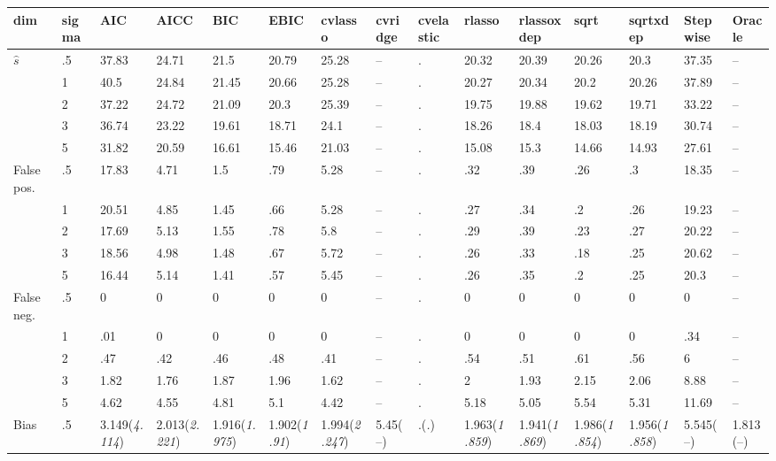 \documentclass{article}
\begin{document}
\begin{table}[tbp] \centering
{}

{\tiny
\begin{tabularx}{\textwidth}{lCCCCCCCCCCCCCC}

\toprule
{dim}&{sigma}&{AIC}&{AICC}&{BIC}&{EBIC}&{cvlasso}&{cvridge}&{cvelastic}&{rlasso}&{rlassoxdep}&{sqrt}&{sqrtxdep}&{Stepwise}&{Oracle} \tabularnewline
\midrule\addlinespace[1.5ex]
$\hat{s}$&.5&37.83&24.71&21.5&20.79&25.28&--&.&20.32&20.39&20.26&20.3&37.35&-- \tabularnewline
&1&40.5&24.84&21.45&20.66&25.28&--&.&20.27&20.34&20.2&20.26&37.89&-- \tabularnewline
&2&37.22&24.72&21.09&20.3&25.39&--&.&19.75&19.88&19.62&19.71&33.22&-- \tabularnewline
&3&36.74&23.22&19.61&18.71&24.1&--&.&18.26&18.4&18.03&18.19&30.74&-- \tabularnewline
&5&31.82&20.59&16.61&15.46&21.03&--&.&15.08&15.3&14.66&14.93&27.61&-- \tabularnewline
\midrule False pos.&.5&17.83&4.71&1.5&.79&5.28&--&.&.32&.39&.26&.3&18.35&-- \tabularnewline
&1&20.51&4.85&1.45&.66&5.28&--&.&.27&.34&.2&.26&19.23&-- \tabularnewline
&2&17.69&5.13&1.55&.78&5.8&--&.&.29&.39&.23&.27&20.22&-- \tabularnewline
&3&18.56&4.98&1.48&.67&5.72&--&.&.26&.33&.18&.25&20.62&-- \tabularnewline
&5&16.44&5.14&1.41&.57&5.45&--&.&.26&.35&.2&.25&20.3&-- \tabularnewline
\midrule False neg.&.5&0&0&0&0&0&--&.&0&0&0&0&0&-- \tabularnewline
&1&.01&0&0&0&0&--&.&0&0&0&0&.34&-- \tabularnewline
&2&.47&.42&.46&.48&.41&--&.&.54&.51&.61&.56&6&-- \tabularnewline
&3&1.82&1.76&1.87&1.96&1.62&--&.&2&1.93&2.15&2.06&8.88&-- \tabularnewline
&5&4.62&4.55&4.81&5.1&4.42&--&.&5.18&5.05&5.54&5.31&11.69&-- \tabularnewline
\midrule Bias&.5&3.149\newline (\emph{4.114})&2.013\newline (\emph{2.221})&1.916\newline (\emph{1.975})&1.902\newline (\emph{1.91})&1.994\newline (\emph{2.247})&5.45\newline (--)&.\newline (\emph{.})&1.963\newline (\emph{1.859})&1.941\newline (\emph{1.869})&1.986\newline (\emph{1.854})&1.956\newline (\emph{1.858})&5.545\newline (--)&1.813\newline (--) \tabularnewline

\end{tabularx}}
\end{table}
\end{document}
